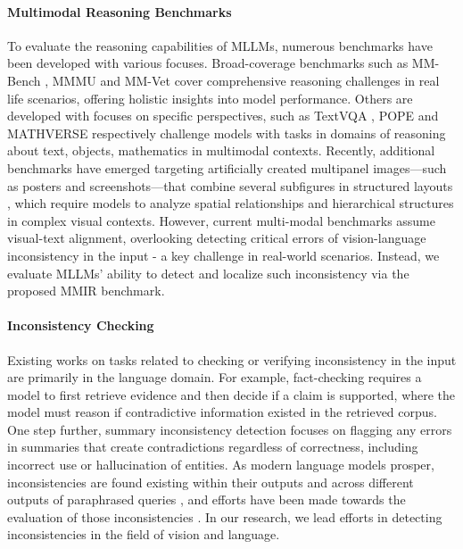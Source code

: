 \paragraph{Multimodal Reasoning Benchmarks} To evaluate the reasoning capabilities of MLLMs, numerous benchmarks have been developed with various focuses. Broad-coverage benchmarks such as MM-Bench \cite{liu2024mmbench}, MMMU \cite{yue2023mmmu} and MM-Vet \cite{yu2024mmvetevaluatinglargemultimodal} cover comprehensive reasoning challenges in real life scenarios, offering holistic insights into model performance. Others are developed with focuses on specific perspectives, such as TextVQA \cite{singh2019towards}, POPE \cite{li2023evaluatingobjecthallucinationlarge} and MATHVERSE \cite{zhang2024mathversedoesmultimodalllm} respectively challenge models with tasks in domains of reasoning about text, objects, mathematics in multimodal contexts. Recently, additional benchmarks have emerged targeting artificially created multipanel images—such as posters and screenshots—that combine several subfigures in structured layouts \cite{fan2024muffin,hsiao2025screenqalargescalequestionanswerpairs}, which require models to analyze spatial relationships and hierarchical structures in complex visual contexts.
However, current multi-modal benchmarks assume visual-text alignment, overlooking detecting critical errors of vision-language inconsistency in the input - a key challenge in real-world scenarios. Instead, we evaluate MLLMs’ ability to detect and localize such inconsistency via the proposed MMIR benchmark.

\paragraph{Inconsistency Checking}
Existing works on tasks related to checking or verifying inconsistency in the input are primarily in the language domain. For example, fact-checking \cite{thorne2018fever} requires a model to first retrieve evidence and then decide if a claim is supported, where the model must reason if contradictive information existed in the retrieved corpus. One step further, summary inconsistency detection \cite{laban2022summac} focuses on flagging any errors in summaries that create contradictions regardless of correctness, including incorrect use or hallucination of entities. As modern language models prosper, inconsistencies are found existing within their outputs \cite{ravichander2020systematicity} and across different outputs of paraphrased queries \cite{elazar2021measuring}, and efforts have been made towards the evaluation of those inconsistencies \cite{fabbri2021qafacteval,wang2020asking,lattimer2023fast}. In our research, we lead efforts in detecting inconsistencies in the field of vision and language.